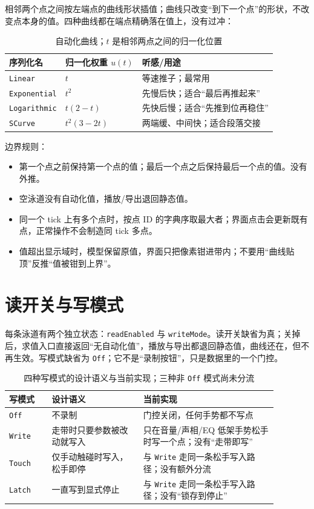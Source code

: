 相邻两个点之间按左端点的曲线形状插值；曲线只改变“到下一个点”的形状，不改变点本身的值。四种曲线都在端点精确落在值上，没有过冲：

\begin{table}[htbp]
\centering
\small
\begin{tabular}{@{}lll@{}}
\hline
序列化名 & 归一化权重 $u(t)$ & 听感/用途 \\
\hline
\texttt{Linear} & $t$ & 等速推子；最常用 \\
\texttt{Exponential} & $t^2$ & 先慢后快；适合“最后再推起来” \\
\texttt{Logarithmic} & $t(2-t)$ & 先快后慢；适合“先推到位再稳住” \\
\texttt{SCurve} & $t^2(3-2t)$ & 两端缓、中间快；适合段落交接 \\
\hline
\end{tabular}
\caption{自动化曲线；$t$ 是相邻两点之间的归一化位置}
\label{tab:automation-curves}
\end{table}

边界规则：

\begin{itemize}
  \item 第一个点之前保持第一个点的值；最后一个点之后保持最后一个点的值。没有外推。
  \item 空泳道没有自动化值，播放/导出退回静态值。
  \item 同一个 tick 上有多个点时，按点 ID 的字典序取最大者；界面点击会更新既有点，正常操作不会制造同 tick 多点。
  \item 值超出显示域时，模型保留原值，界面只把像素钳进带内；不要用“曲线贴顶”反推“值被钳到上界”。
\end{itemize}

\section{读开关与写模式}

每条泳道有两个独立状态：\texttt{readEnabled} 与 \texttt{writeMode}。读开关缺省为真；关掉后，求值入口直接返回“无自动化值”，播放与导出都退回静态值，曲线还在，但不再生效。写模式缺省为 \texttt{Off}；它不是“录制按钮”，只是数据里的一个门控。

\begin{table}[htbp]
\centering
\small
\begin{tabular}{@{}p{0.14\linewidth}p{0.30\linewidth}p{0.44\linewidth}@{}}
\hline
写模式 & 设计语义 & 当前实现 \\
\hline
\texttt{Off} & 不录制 & 门控关闭，任何手势都不写点 \\
\texttt{Write} & 走带时只要参数被改动就写入 & 只在音量/声相/EQ 低架手势松手时写一个点；没有“走带即写” \\
\texttt{Touch} & 仅手动触碰时写入，松手即停 & 与 \texttt{Write} 走同一条松手写入路径；没有额外分流 \\
\texttt{Latch} & 一直写到显式停止 & 与 \texttt{Write} 走同一条松手写入路径；没有“锁存到停止” \\
\hline
\end{tabular}
\caption{四种写模式的设计语义与当前实现；三种非 \texttt{Off} 模式尚未分流}
\label{tab:automation-write-modes}
\end{table}

